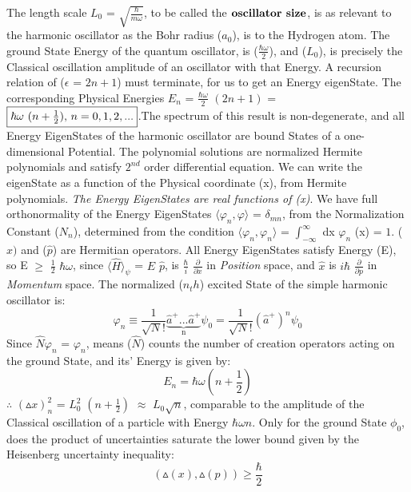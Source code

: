 \documentclass[a4paper, 10pt, onepage]{elegantbook}
\begin{document}
{The length scale $L_0$ = $\sqrt{\frac{\hbar}{m \omega}}$, to be called the $\mathbf{\textbf{oscillator 
size\index{oscillator size}}}$, is as relevant to the harmonic oscillator as the Bohr radius ($a_0$), is to the 
Hydrogen atom. The ground State Energy of the quantum oscillator, is ($\frac{\hbar \omega}{2}$), and ($L_0$), is 
precisely the Classical oscillation amplitude of an oscillator with that Energy. A recursion relation of ($\epsilon$ = 
$2n + 1$) must terminate, for us to get an Energy eigenState. The corresponding Physical Energies $E_n$ = $\frac{\hbar 
\omega}{2}$ $(2n + 1)$ = $\boxed{\hbar \omega$ $(n + \frac{1}{2})$, $n = 0,1,2,...}$.The spectrum of this result is 
non-degenerate, and all Energy EigenStates of the harmonic oscillator are bound States of a one-dimensional Potential. 
The polynomial solutions are normalized Hermite polynomials and satisfy $2^{nd}$ order differential equation. We can 
write the eigenState as a function of the Physical coordinate (x), from Hermite polynomials. \emph{The Energy 
EigenStates are real functions of (x)}. We have full orthonormality of the Energy EigenStates $\langle \varphi_n, 
\varphi \rangle$ = $\delta_{mn}$, from the Normalization
Constant ($N_n$), determined from the condition $\langle \varphi_n, \varphi_n \rangle$ = $\int_{- \infty}^\infty$ dx 
$\varphi_n$ (x) = $1$. ($\hat x)$  and ($\hat p$) are Hermitian operators. All Energy EigenStates satisfy Energy (E),  
so E $\geq$ $\frac{1}{2}$ $\hbar \omega$, since $\langle \hat H \rangle_\psi$ = $E$ $\hat p$, is $\frac{\hbar}{i}$ 
$\frac{\partial}{\partial x}$ in \emph{Position} space, and $\hat x$ is $i \hbar$ $\frac{\partial}{\partial p}$ in 
\emph{Momentum} space. The normalized ($n_th$) excited State of the simple harmonic oscillator is:
\begin{equation}
\varphi_n \equiv \frac{1}{\sqrt N!} \underbrace{\hat a^{+}...\hat a^{+}}_\text{n} \psi_0 = \frac{1}{\sqrt N!} (\hat 
a^{+})^n \psi_0
\end{equation}
Since $\hat N \varphi_n$ = $\varphi_n$, means ($\hat N$) counts the number of creation operators acting on the ground 
State, and its' Energy is given by:
\begin{equation}
E_n = \hbar \omega (n + \frac{1}{2})
\end{equation}
$\therefore$ $(\vartriangle x)^2_n$ = $L^2_0$ $(n + \frac{1}{2})$ $\approx$ $L_0 \sqrt{n}$, comparable to the amplitude 
of the Classical oscillation of a particle with Energy $\hbar \omega n$. Only for the ground State $\phi_0$, does the 
product of uncertainties saturate the lower bound given by the Heisenberg uncertainty inequality:
\begin{equation} \label{eq:Heisenberg uncertainty inequality}
(\vartriangle(x), \vartriangle (p)) \geq \frac{\hbar}{2}
\end{equation}

}
\end{document}
